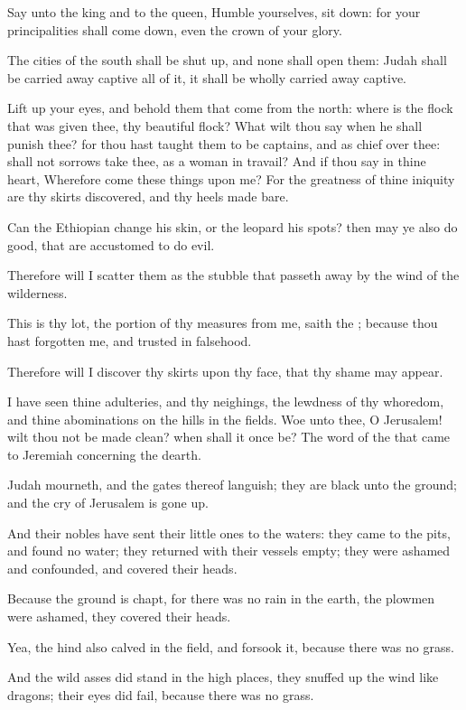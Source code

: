 \Verse Say unto the king and to the queen, Humble yourselves, sit down: for your principalities shall come down, even the crown of your glory.

\Verse The cities of the south shall be shut up, and none shall open them: Judah shall be carried away captive all of it, it shall be wholly carried away captive.

\Verse Lift up your eyes, and behold them that come from the north: where is the flock that was given thee, thy beautiful flock?  \Verse What wilt thou say when he shall punish thee? for thou hast taught them to be captains, and as chief over thee: shall not sorrows take thee, as a woman in travail?  \Verse And if thou say in thine heart, Wherefore come these things upon me?  For the greatness of thine iniquity are thy skirts discovered, and thy heels made bare.

\Verse Can the Ethiopian change his skin, or the leopard his spots?  then may ye also do good, that are accustomed to do evil.

\Verse Therefore will I scatter them as the stubble that passeth away by the wind of the wilderness.

\Verse This is thy lot, the portion of thy measures from me, saith the \LORD; because thou hast forgotten me, and trusted in falsehood.

\Verse Therefore will I discover thy skirts upon thy face, that thy shame may appear.

\Verse I have seen thine adulteries, and thy neighings, the lewdness of thy whoredom, and thine abominations on the hills in the fields. Woe unto thee, O Jerusalem! wilt thou not be made clean? when shall it once be?  
\Chapter
\Verse The word of the \LORD that came to Jeremiah concerning the dearth.

\Verse Judah mourneth, and the gates thereof languish; they are black unto the ground; and the cry of Jerusalem is gone up.

\Verse And their nobles have sent their little ones to the waters: they came to the pits, and found no water; they returned with their vessels empty; they were ashamed and confounded, and covered their heads.

\Verse Because the ground is chapt, for there was no rain in the earth, the plowmen were ashamed, they covered their heads.

\Verse Yea, the hind also calved in the field, and forsook it, because there was no grass.

\Verse And the wild asses did stand in the high places, they snuffed up the wind like dragons; their eyes did fail, because there was no grass.


